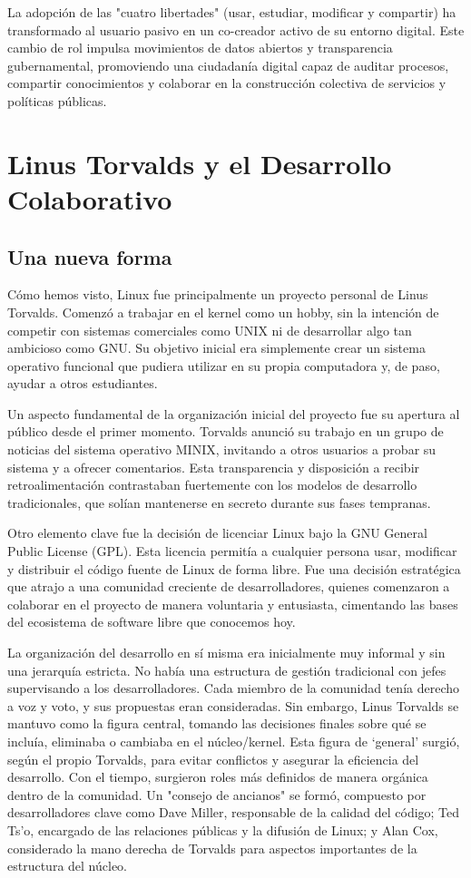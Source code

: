 \documentclass[a4paper,12pt]{article}
\begin{document}
La adopción de las "cuatro libertades" (usar, estudiar, modificar y compartir) ha transformado al 
usuario pasivo en un co-creador activo de su entorno digital. Este cambio de rol impulsa movimientos 
de datos abiertos y transparencia gubernamental, promoviendo una ciudadanía digital capaz de auditar 
procesos, compartir conocimientos y colaborar en la construcción colectiva de servicios y políticas 
públicas.

\section{Linus Torvalds y el Desarrollo Colaborativo}

\subsection{Una nueva forma}

Cómo hemos visto, Linux fue principalmente un proyecto personal de Linus Torvalds.
Comenzó a trabajar en el kernel como un hobby, sin la intención de competir con
sistemas comerciales como UNIX ni de desarrollar algo tan ambicioso como GNU. Su
objetivo inicial era simplemente crear un sistema operativo funcional que
pudiera utilizar en su propia computadora y, de paso, ayudar a otros
estudiantes.

Un aspecto fundamental de la organización inicial del proyecto fue su apertura
al público desde el primer momento. Torvalds anunció su trabajo en un grupo de
noticias del sistema operativo MINIX, invitando a otros usuarios a probar su
sistema y a ofrecer comentarios. Esta transparencia y disposición a recibir
retroalimentación contrastaban fuertemente con los modelos de desarrollo
tradicionales, que solían mantenerse en secreto durante sus fases tempranas.

Otro elemento clave fue la decisión de licenciar Linux bajo la GNU General
Public License (GPL). Esta licencia permitía a cualquier persona usar, modificar
y distribuir el código fuente de Linux de forma libre. Fue una decisión
estratégica que atrajo a una comunidad creciente de desarrolladores, quienes
comenzaron a colaborar en el proyecto de manera voluntaria y entusiasta,
cimentando las bases del ecosistema de software libre que conocemos hoy.

La organización del desarrollo en sí misma era inicialmente muy informal y sin
una jerarquía estricta. No había una estructura de gestión tradicional con jefes
supervisando a los desarrolladores. Cada miembro de la comunidad tenía derecho a
voz y voto, y sus propuestas eran consideradas. Sin embargo, Linus Torvalds se
mantuvo como la figura central, tomando las decisiones finales sobre qué se
incluía, eliminaba o cambiaba en el núcleo/kernel. Esta figura de `general'
surgió, según el propio Torvalds, para evitar conflictos y asegurar la
eficiencia del desarrollo.  Con el tiempo, surgieron roles más definidos de
manera orgánica dentro de la comunidad. Un "consejo de ancianos" se formó,
compuesto por desarrolladores clave como Dave Miller, responsable de la calidad
del código; Ted Ts'o, encargado de las relaciones públicas y la difusión de
Linux; y Alan Cox, considerado la mano derecha de Torvalds para aspectos
importantes de la estructura del núcleo.
\end{document}
